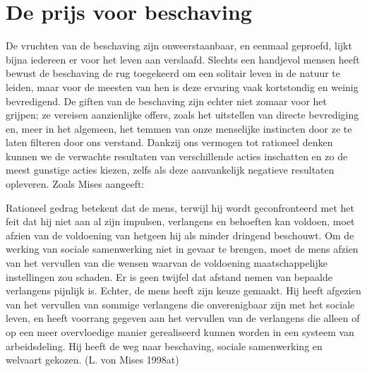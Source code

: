 \documentclass[
  a5paper,
  smalldemyvopaper,11pt,twoside,onecolumn,openright,extrafontsizes,
hidelinks]{memoir}
\begin{document}
\section{De prijs voor beschaving}\label{de-prijs-voor-beschaving}

De vruchten van de beschaving zijn onweerstaanbaar, en eenmaal geproefd,
lijkt bijna iedereen er voor het leven aan verslaafd. Slechts een
handjevol mensen heeft bewust de beschaving de rug toegekeerd om een
solitair leven in de natuur te leiden, maar voor de meesten van hen is
deze ervaring vaak kortstondig en weinig bevredigend. De giften van de
beschaving zijn echter niet zomaar voor het grijpen; ze vereisen
aanzienlijke offers, zoals het uitstellen van directe bevrediging en,
meer in het algemeen, het temmen van onze menselijke instincten door ze
te laten filteren door ons verstand. Dankzij ons vermogen tot rationeel
denken kunnen we de verwachte resultaten van verschillende acties
inschatten en zo de meest gunstige acties kiezen, zelfs als deze
aanvankelijk negatieve resultaten opleveren. Zoals Mises aangeeft:

Rationeel gedrag betekent dat de mens, terwijl hij wordt geconfronteerd
met het feit dat hij niet aan al zijn impulsen, verlangens en behoeften
kan voldoen, moet afzien van de voldoening van hetgeen hij als minder
dringend beschouwt. Om de werking van sociale samenwerking niet in
gevaar te brengen, moet de mens afzien van het vervullen van die wensen
waarvan de voldoening maatschappelijke instellingen zou schaden. Er is
geen twijfel dat afstand nemen van bepaalde verlangens pijnlijk is.
Echter, de mens heeft zijn keuze gemaakt. Hij heeft afgezien van het
vervullen van sommige verlangens die onverenigbaar zijn met het sociale
leven, en heeft voorrang gegeven aan het vervullen van de verlangens die
alleen of op een meer overvloedige manier gerealiseerd kunnen worden in
een systeem van arbeidsdeling. Hij heeft de weg naar beschaving, sociale
samenwerking en welvaart gekozen. (L. von Mises 1998at)
\end{document}
